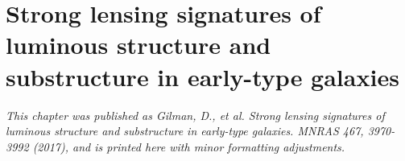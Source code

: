 \chapter{Strong lensing signatures of luminous structure and substructure in early-type galaxies}

\textit{This chapter was published as Gilman, D., et al. Strong lensing signatures of luminous structure and substructure in early-type galaxies. MNRAS 467, 3970-3992 (2017), and is printed here with minor formatting adjustments.}
